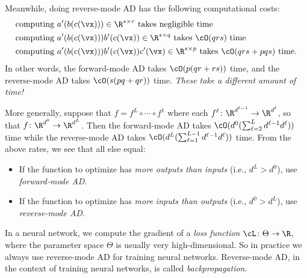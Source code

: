 \documentclass[../../book-main.tex]{subfiles}
\begin{document}
Meanwhile, doing reverse-mode AD has the following computational costs:
\begin{align}
    &\text{computing}\ a^{\prime}(b(c(\vx))) \in \R^{s \times
    r}\ \text{takes negligible time} \\
    &\text{computing}\ a^{\prime}(b(c(\vx)))b^{\prime}(c(\vx)) \in
    \R^{s \times q}\ \text{takes \(\cO(qrs)\) time} \\
    &\text{computing}\ a^{\prime}(b(c(\vx)))b^{\prime}(c(\vx))c^{\prime}(\vx)
    \in \R^{s \times p}\ \text{takes \(\cO(qrs + pqs)\) time.}
\end{align}
In other words, the forward-mode AD takes \(\cO(p(qr + rs))\) time,
and the reverse-mode AD takes \(\cO(s(pq + qr))\) time. \textit{These
take a different amount of time!}

More generally, suppose that \(f = f^{L} \circ \cdots \circ f^{1}\)
where each \(f^{\ell} \colon \R^{d^{\ell - 1}} \to \R^{d^{\ell}}\),
so that \(f \colon \R^{d^{0}} \to \R^{d^{L}}\). Then the forward-mode
AD takes \(\cO(d^{0}(\sum_{\ell = 2}^{L}d^{\ell - 1}d^{\ell}))\) time
while the reverse-mode AD takes \(\cO(d^{L}(\sum_{\ell = 1}^{L -
1}d^{\ell - 1}d^{\ell}))\) time. From the above rates, we see that
all else equal:
\begin{itemize}
    \item If the function to optimize has \textit{more outputs than
        inputs} (i.e., \(d^{L} > d^{0}\)), use \textit{forward-mode AD}.
    \item If the function to optimize has \textit{more inputs than
        outputs} (i.e., \(d^{0} > d^{L}\)), use \textit{reverse-mode AD}.
\end{itemize}
In a neural network, we compute the gradient of a \textit{loss
function} \(\cL \colon \Theta \to \R\), where the parameter space
\(\Theta\) is usually very high-dimensional. So in practice we always
use reverse-mode AD for training neural networks. Reverse-mode AD, in
the context of training neural networks, is called \textit{backpropagation}.
\end{document}
